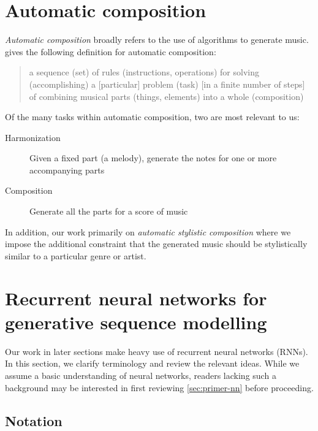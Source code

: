\section{Automatic composition}\label{sec:automatic-composition}

\emph{Automatic composition} broadly refers to the use of algorithms to
generate music. \citet{papadopoulos1999ai} gives the following definition for
automatic composition:
\begin{quote}
  a sequence (set) of rules (instructions, operations) for solving
  (accomplishing) a [particular] problem (task) [in a finite number of steps]
  of combining musical parts (things, elements) into a whole (composition)
\end{quote}
Of the many tasks within automatic composition, two are most relevant to us:
\begin{description}
  \item[Harmonization] Given a fixed part (\eg a melody), generate the notes for
    one or more accompanying parts
  \item[Composition] Generate all the parts for a score of music
\end{description}
In addition, our work primarily on \emph{automatic stylistic composition} where
we impose the additional constraint that the generated music should be
stylistically similar to a particular genre or artist.

\section{Recurrent neural networks for generative sequence modelling}


Our work in later sections make heavy use of recurrent neural networks (RNNs).
In this section, we clarify terminology and review the relevant ideas.
While we assume a basic understanding of neural networks, readers lacking
such a background may be interested in first reviewing \vref{sec:primer-nn}
before proceeding.

\subsection{Notation}


